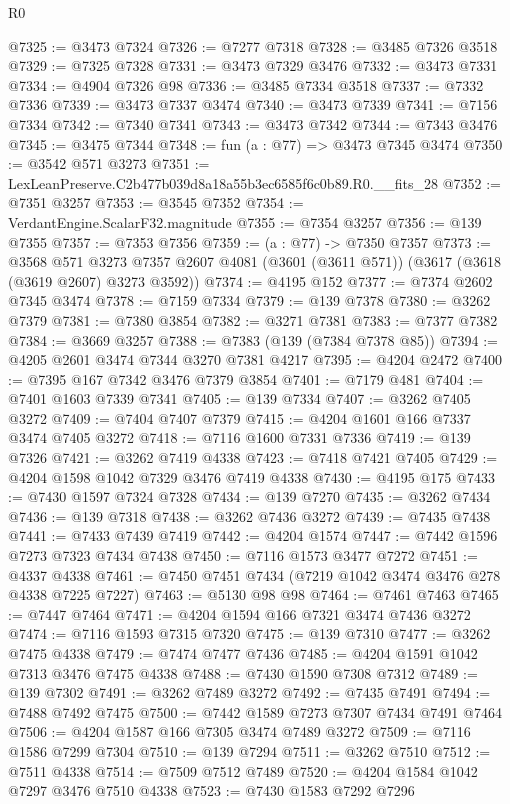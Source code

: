 \begin{lexlean}{R0}
\begin{coremodule}
@7325 := @3473 @7324
@7326 := @7277 @7318
@7328 := @3485 @7326 @3518
@7329 := @7325 @7328
@7331 := @3473 @7329 @3476
@7332 := @3473 @7331
@7334 := @4904 @7326 @98
@7336 := @3485 @7334 @3518
@7337 := @7332 @7336
@7339 := @3473 @7337 @3474
@7340 := @3473 @7339
@7341 := @7156 @7334
@7342 := @7340 @7341
@7343 := @3473 @7342
@7344 := @7343 @3476
@7345 := @3475 @7344
@7348 := fun (a : @77) => @3473 @7345 @3474
@7350 := @3542 @571 @3273
@7351 := LexLeanPreserve.C2b477b039d8a18a55b3ec6585f6c0b89.R0.__fits_28
@7352 := @7351 @3257
@7353 := @3545 @7352
@7354 := VerdantEngine.ScalarF32.magnitude
@7355 := @7354 @3257
@7356 := @139 @7355
@7357 := @7353 @7356
@7359 := (a : @77) -> @7350 @7357
@7373 := @3568
    @571
    @3273
    @7357
    @2607
    @4081
    (@3601 (@3611 @571))
    (@3617 (@3618 (@3619 @2607) @3273 @3592))
@7374 := @4195 @152
@7377 := @7374 @2602 @7345 @3474
@7378 := @7159 @7334
@7379 := @139 @7378
@7380 := @3262 @7379
@7381 := @7380 @3854
@7382 := @3271 @7381
@7383 := @7377 @7382
@7384 := @3669 @3257
@7388 := @7383 (@139 (@7384 @7378 @85))
@7394 := @4205 @2601 @3474 @7344 @3270 @7381 @4217
@7395 := @4204 @2472
@7400 := @7395 @167 @7342 @3476 @7379 @3854
@7401 := @7179 @481
@7404 := @7401 @1603 @7339 @7341
@7405 := @139 @7334
@7407 := @3262 @7405 @3272
@7409 := @7404 @7407 @7379
@7415 := @4204 @1601 @166 @7337 @3474 @7405 @3272
@7418 := @7116 @1600 @7331 @7336
@7419 := @139 @7326
@7421 := @3262 @7419 @4338
@7423 := @7418 @7421 @7405
@7429 := @4204 @1598 @1042 @7329 @3476 @7419 @4338
@7430 := @4195 @175
@7433 := @7430 @1597 @7324 @7328
@7434 := @139 @7270
@7435 := @3262 @7434
@7436 := @139 @7318
@7438 := @3262 @7436 @3272
@7439 := @7435 @7438
@7441 := @7433 @7439 @7419
@7442 := @4204 @1574
@7447 := @7442 @1596 @7273 @7323 @7434 @7438
@7450 := @7116 @1573 @3477 @7272
@7451 := @4337 @4338
@7461 := @7450 @7451 @7434 (@7219 @1042 @3474 @3476 @278 @4338 @7225 @7227)
@7463 := @5130 @98 @98
@7464 := @7461 @7463
@7465 := @7447 @7464
@7471 := @4204 @1594 @166 @7321 @3474 @7436 @3272
@7474 := @7116 @1593 @7315 @7320
@7475 := @139 @7310
@7477 := @3262 @7475 @4338
@7479 := @7474 @7477 @7436
@7485 := @4204 @1591 @1042 @7313 @3476 @7475 @4338
@7488 := @7430 @1590 @7308 @7312
@7489 := @139 @7302
@7491 := @3262 @7489 @3272
@7492 := @7435 @7491
@7494 := @7488 @7492 @7475
@7500 := @7442 @1589 @7273 @7307 @7434 @7491 @7464
@7506 := @4204 @1587 @166 @7305 @3474 @7489 @3272
@7509 := @7116 @1586 @7299 @7304
@7510 := @139 @7294
@7511 := @3262 @7510
@7512 := @7511 @4338
@7514 := @7509 @7512 @7489
@7520 := @4204 @1584 @1042 @7297 @3476 @7510 @4338
@7523 := @7430 @1583 @7292 @7296

\end{coremodule}
\end{lexlean}
